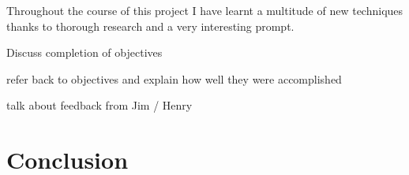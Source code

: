 \documentclass[11pt,a4paper,titlepage]{report}
\begin{document}







    
    Throughout the course of this project I have learnt a multitude of new techniques thanks to thorough research and a very interesting prompt.

    Discuss completion of objectives

	refer back to objectives and explain how well they were accomplished
	
	talk about feedback from Jim / Henry












\chapter{Conclusion}



	\newpage

	\printbibliography{}
\end{document}
